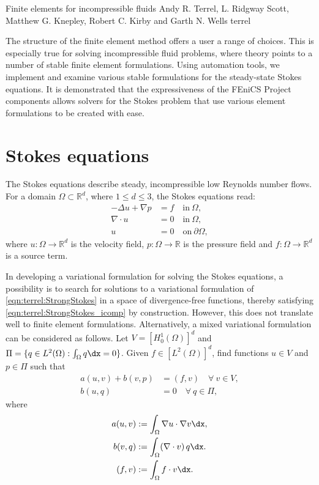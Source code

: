              {Finite elements for incompressible fluids}
              {Andy R. Terrel, L. Ridgway Scott, Matthew G. Knepley,
               Robert C. Kirby and Garth N. Wells}
              {terrel}


The structure of the finite element method offers a user a range of
choices.  This is especially true for solving incompressible fluid
problems, where theory points to a number of stable finite element
formulations. Using automation tools, we implement and examine various
stable formulations for the steady-state Stokes equations.  It is
demonstrated that the expressiveness of the FEniCS Project components
allows solvers for the Stokes problem that use various element
formulations to be created with ease.
\section{Stokes equations}
\label{sec:terrel:Stokes}

The Stokes equations describe steady, incompressible low Reynolds number
flows. For a domain $\Omega \subset \mathbb{R}^{d}$, where $1 \le d \le 3$,
the Stokes equations read:
%
\begin{align}
     -\Delta u + \nabla p &= f \quad \mbox{in} \ \Omega,
\label{eqn:terrel:StrongStokes}
\\
      \nabla\cdot u &= 0 \quad \mbox{in} \ \Omega,
\label{eqn:terrel:StrongStokes_icomp}
\\
      u &= 0 \quad \mbox{on} \  \partial \Omega,
\end{align}
%
where $u : \Omega \rightarrow \mathbb{R}^{d}$ is the velocity field, $p
: \Omega \rightarrow \mathbb{R}$ is the pressure field and $f : \Omega
\rightarrow \mathbb{R}^{d}$ is a source term.

In developing a variational formulation for solving the Stokes equations,
a possibility is to search for solutions to a variational formulation of
\eqref{eqn:terrel:StrongStokes} in a space of divergence-free functions,
thereby satisfying \eqref{eqn:terrel:StrongStokes_icomp} by construction.
However, this does not translate well to finite element
formulations. Alternatively, a mixed variational formulation can be
considered as follows. Let $V = [H^{1}_{0}(\Omega)]^d$ and $\Pi = \{q \in
L^2(\Omega) : \int_\Omega q \dx = 0\}$.  Given $f \in [L^{2}(\Omega)]^d$,
find functions $u \in V$ and $p \in \Pi$ such that
%
\begin{align}
    a(u, v) + b(v, p)  &=  (f, v) \quad \forall \ v \in V,
\label{eqn:stokes_momentum}
\\
    b(u, q) &= 0 \quad \forall \ q \in \Pi,
\label{eqn:stokes_continuity}
\end{align}
%
where
%
\begin{align}
  a(u, v) &:= \int_\Omega \nabla{u} \cdot \nabla v \dx,
\\
  b(v, q) &:= \int_\Omega (\nabla\cdot v) \, q \dx.
\\
  (f, v) &:= \int_\Omega f \cdot v \dx.
\end{align}
